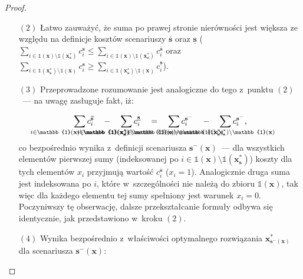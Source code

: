 \begin{proof}
\begin{itemize}
		\item[$\left( 2 \right)$] Łatwo zauważyć, że suma po prawej stronie nierówności jest większa ze względu na definicje kosztów scenariuszy $\overline{\textbf{s}}$ oraz $\underline{\textbf{s}}$ ($\sum_{i \in \mathbb{1} \left( \textbf{x} \right) \setminus \mathbb{1} \left( \textbf{x}^{\ast}_{\textbf{s}} \right)} c_{i}^{\textbf{s}} \leqslant \sum_{i \in \mathbb{1} \left( \textbf{x} \right) \setminus \mathbb{1} \left( \textbf{x}^{\ast}_{\textbf{s}} \right)} c_{i}^{\overline{\textbf{s}}}$ oraz $\sum_{i \in \mathbb{1} \left( \textbf{x}^{\ast}_{\textbf{s}} \right) \setminus \mathbb{1} \left( \textbf{x} \right)} c_{i}^{\textbf{s}} \geqslant \sum_{i \in \mathbb{1} \left( \textbf{x}^{\ast}_{\textbf{s}} \right) \setminus \mathbb{1} \left( \textbf{x} \right)} c_{i}^{\underline{\textbf{s}}}$). 
		\item[$\left( 3 \right)$] Przeprowadzone rozumowanie jest analogiczne do tego z~punktu $\left( 2 \right)$~--- na uwagę zasługuje fakt, iż:
		
		\begin{equation*}
			\sum_{\mathclap{i \in \mathbb{1} \left( \textbf{x} \right) \setminus \mathbb{1} \left( \textbf{x}^{\ast}_{\textbf{s}} \right)}} c^{\overline{\textbf{s}}}_{i} \quad - \quad \sum_{\mathclap{i \in \mathbb{1} \left( \textbf{x}^{\ast}_{\textbf{s}} \right) \setminus \mathbb{1} \left( \textbf{x} \right)}} c^{\underline{\textbf{s}}}_{i} \quad = \quad \sum_{\mathclap{i \in \mathbb{1} \left( \textbf{x} \right) \setminus \mathbb{1} \left( \textbf{x}^{\ast}_{\textbf{s}} \right)}} c^{\textbf{s}^{-}}_{i} \quad - \quad \sum_{\mathclap{i \in \mathbb{1} \left( \textbf{x}^{\ast}_{\textbf{s}} \right) \setminus \mathbb{1} \left( \textbf{x} \right)}} c^{\textbf{s}^{-}}_{i}\text{,}
		\end{equation*}
		co bezpośrednio wynika z~definicji scenariusza $\textbf{s}^{-} \left( \textbf{x} \right)$~--- dla wszystkich elementów pierwszej sumy (indeksowanej po $i \in \mathbb{1} \left( \textbf{x} \right) \setminus \mathbb{1} \left( \textbf{x}^{\ast}_{\textbf{s}} \right)$) koszty dla tych elementów $x_{i}$ przyjmują wartość $c^{\overline{\textbf{s}}}_{i}$ ($x_{i} = 1$).
		Analogicznie druga suma jest indeksowana po $i$, które w~szczególności nie należą do zbioru $\mathbb{1} \left( \textbf{x} \right)$, tak więc dla każdego elementu tej sumy spełniony jest warunek $x_{i} = 0$.
		Poczyniwszy tę obserwację, dalsze przekształcanie formuły odbywa się identycznie, jak przedstawiono w~kroku $\left( 2 \right)$.
		\item[$\left( 4 \right)$] Wynika bezpośrednio z~właściwości optymalnego rozwiązania $\textbf{x}^{\ast}_{\textbf{s}^{-} \left( \textbf{x} \right)}$ dla scenariusza $\textbf{s}^{-} \left( \textbf{x} \right)$:
		

\end{itemize}
\end{proof}
